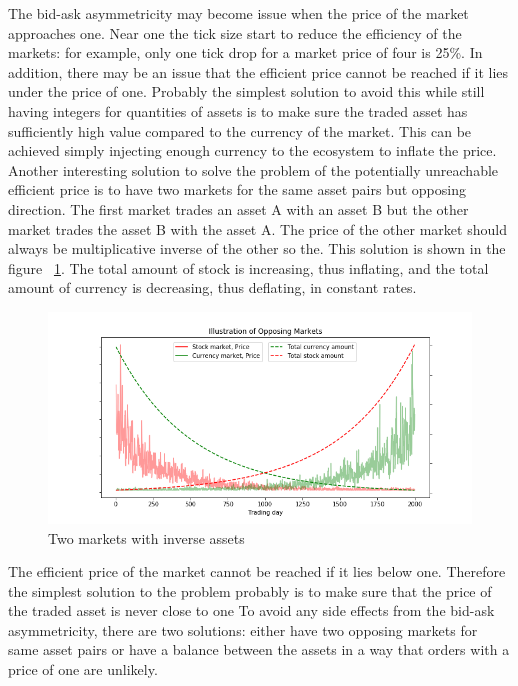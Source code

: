 The bid-ask asymmetricity may become issue when the price of the market
approaches one. Near one the tick size start to reduce the efficiency
of the markets: for example, only one tick drop for a market price 
of four is 25\%. In addition, there may be an issue that the efficient
price cannot be reached if it lies under the price of one. Probably
the simplest solution to avoid this while still having integers for quantities 
of assets is to make sure the traded asset has sufficiently high value
compared to the currency of the market. This can be achieved simply injecting
enough currency to the ecosystem to inflate the price. Another interesting 
solution to solve the problem of the potentially unreachable efficient price 
is to have two markets for the same asset pairs but opposing direction. 
The first market trades an asset A with an asset B but the 
other market trades the asset B with the asset A. The price of the other market
should always be multiplicative inverse of the other so the.
This solution is shown in the figure ~\ref{fig:opposing_markets}. The total
amount of stock is increasing, thus inflating, and the total amount of
currency is decreasing, thus deflating, in constant rates.

\begin{figure}
    \includegraphics[width=\linewidth]{plots/opposing_markets.png}
    \caption{Two markets with inverse assets}
    \label{fig:opposing_markets}
\end{figure}


The efficient price of the market cannot be reached if it
lies below one. Therefore the simplest solution to the problem probably
is to make sure that the price of the traded asset is never close to one
To avoid any side effects from the bid-ask asymmetricity, there are two solutions:
either have two opposing markets for same asset pairs or have a balance between the 
assets in a way that orders with a price of one are unlikely. 